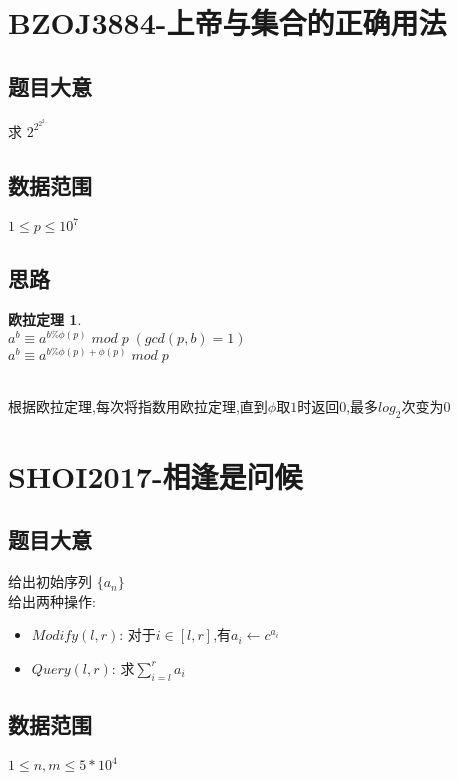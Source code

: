 \documentclass{ctexart}
\numberwithin{equation}{section}
\newtheorem{problem}{欧拉定理}
\begin{document}
\begin{flushleft}
  \section{BZOJ3884-上帝与集合的正确用法}
  \subsection{题目大意}
  求 $2^{2^{2^{2...}}}$\\
  \subsection{数据范围}
  $1\le p\le10^7$\\
  \subsection{思路}
  \begin{problem}
    ~\\
    $a^b \equiv a^{b\% \phi(p)}\; mod \; p\; (gcd(p,b)=1)$\\
    $a^b \equiv a^{b\% \phi(p)+\phi(p)}\; mod\; p$\\
    ~\\
  \end{problem}
  根据欧拉定理,每次将指数用欧拉定理,直到$\phi$取$1$时返回$0$,最多$log_2$次变为$0$\\
  \newpage

  \section{SHOI2017-相逢是问候}
  \subsection{题目大意}
  给出初始序列 $\{a_n\}$\\
  给出两种操作:\\
  \begin{itemize}
  \item $Modify(l,r)$: 对于$i\in[l,r]$,有$a_i \leftarrow c^{a_i}$\\
  \item $Query(l,r)$: 求$\sum_{i=l}^{r}a_i$\\
  \end{itemize}
  \subsection{数据范围}
  $1\le n,m\le 5*10^4$\\

\end{flushleft}
\end{document}

